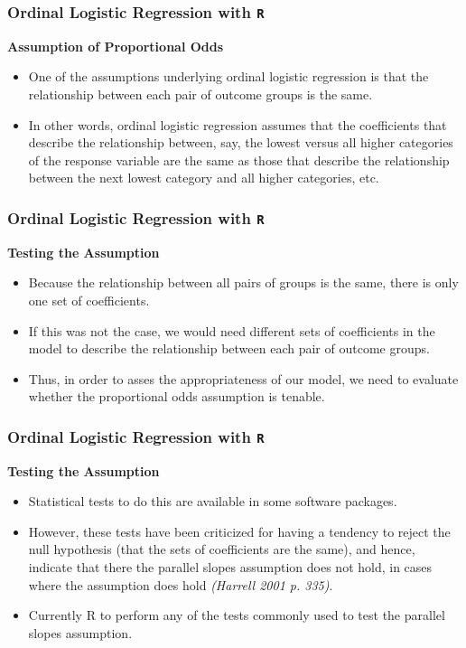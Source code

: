 \documentclass[00-GLMregslides.tex]{subfiles}
\begin{document}
\begin{frame}[fragile]
\frametitle{Ordinal Logistic Regression with \texttt{R}}
\textbf{Assumption of Proportional Odds }
		\Large
		
\begin{itemize}
\item One of the assumptions underlying ordinal logistic regression is that the relationship between each pair of outcome groups is the same. 
\item In other words, ordinal logistic regression assumes that the coefficients that describe the relationship between, say, the lowest versus all higher categories of the response variable are the same as those that describe the relationship between the next lowest category and all higher categories, etc. 
\end{itemize}		
	\end{frame}
	\begin{frame}[fragile]
		
		\frametitle{Ordinal Logistic Regression with \texttt{R}}
		\Large
\textbf{Testing the Assumption}		
\begin{itemize} 
\item Because the relationship between all pairs of groups is the same, there is only one set of coefficients. 
\item If this was not the case, we would need different sets of coefficients in the model to describe the relationship between each pair of outcome groups. 
\item Thus, in order to asses the appropriateness of our model, we need to evaluate whether the proportional odds assumption is tenable.
\end{itemize}		
\end{frame}
\begin{frame}[fragile]
	
\frametitle{Ordinal Logistic Regression with \texttt{R}}
\Large
\textbf{Testing the Assumption}		
\begin{itemize}
\item Statistical tests to do this are available in some software packages. 
\item However, these tests have been criticized for having a tendency to reject the null hypothesis (that the sets of coefficients are the same), and hence, indicate that there the parallel slopes assumption does not hold, in cases where the assumption does hold \textit{ (Harrell 2001 p. 335)}. 
\item Currently R to perform any of the tests commonly used to test the parallel slopes assumption.
\end{itemize}
\end{frame}
\end{document}
